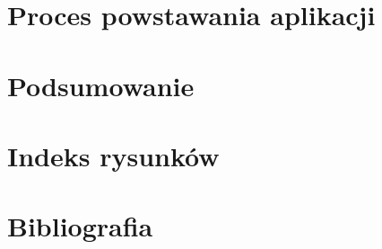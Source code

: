 \documentclass[12pt, a4paper]{article}
\begin{document}
\begin{sloppypar}
{{  }
}

\section{Proces powstawania aplikacji}
{
}

\section{Podsumowanie}
{
}

\section{Indeks rysunków}

\section{Bibliografia}
{
  \printbibliography
}

\end{sloppypar}
\end{document}

